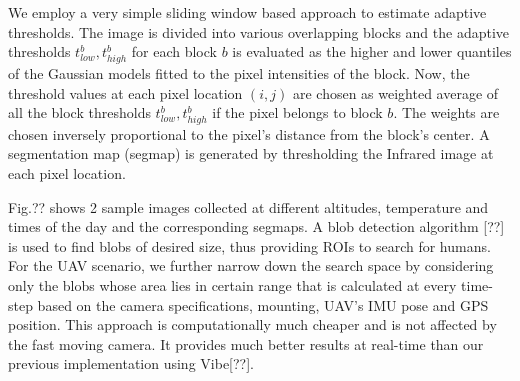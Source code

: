 \documentclass[runningheads]{llncs}
\begin{document}
We employ a very simple sliding window based approach to estimate adaptive thresholds. The image is divided into various overlapping blocks and the adaptive thresholds $t_{low}^b, t_{high}^b$ for each block $b$ is evaluated as the higher and lower quantiles of the Gaussian models fitted to the pixel intensities of the block. Now, the threshold values at each pixel location $(i, j)$ are chosen as weighted average of all the block thresholds $t_{low}^b, t_{high}^b$ if the pixel belongs to block $b$. The weights are chosen inversely proportional to the pixel's distance from the block's center. A segmentation map (segmap) is generated by thresholding the Infrared image at each pixel location.

Fig.?? shows 2 sample images collected at different altitudes, temperature and times of the day and the corresponding segmaps. A blob detection algorithm [??] is used to find blobs of desired size, thus providing ROIs to search for humans. For the UAV scenario, we further narrow down the search space by considering only the blobs whose area lies in certain range that is calculated at every time-step based on the camera specifications, mounting, UAV's IMU pose and GPS position. This approach is computationally much cheaper and is not affected by the fast moving camera. It provides much better results at real-time than our previous implementation using Vibe[??].
\end{document}
